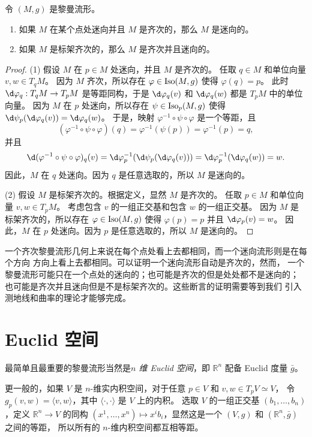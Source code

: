 \begin{proposition}
  令 $(M,g)$ 是黎曼流形。
  \begin{enumerate}
    \item 如果 $M$ 在某个点处迷向并且 $M$ 是齐次的，那么 $M$ 是迷向的。
    \item 如果 $M$ 是标架齐次的，那么 $M$ 是齐次并且迷向的。
  \end{enumerate}
\end{proposition}
\begin{proof}
  (1) 假设 $M$ 在 $p\in M$ 处迷向，并且 $M$ 是齐次的。
  任取 $q\in M$ 和单位向量 $v,w\in T_qM$。
  因为 $M$ 齐次，所以存在 $\varphi\in \operatorname{Iso}(M,g)$ 使得 $\varphi(q)=p$。
  此时 $\d\varphi_q:T_qM \to T_pM$ 是等距同构，于是 $\d\varphi_q(v)$
  和 $\d\varphi_q(w)$ 都是 $T_pM$ 中的单位向量。
  因为 $M$ 在 $p$ 处迷向，所以存在 $\psi\in \operatorname{Iso}_p(M,g)$ 使得
  $\d\psi_p(\d\varphi_q(v))=\d\varphi_q(w)$。
  于是，映射 $\varphi^{-1}\circ \psi\circ \varphi$ 是一个等距，且
  \[
    (\varphi^{-1}\circ \psi\circ \varphi)(q)=\varphi^{-1}(\psi(p))=\varphi^{-1}(p)=q,
  \]
  并且
  \[
    \d(\varphi^{-1}\circ \psi\circ \varphi)_q(v)
    =\d\varphi^{-1}_p(\d\psi_p(\d\varphi_q(v)))
    =\d\varphi^{-1}_p(\d\varphi_q(w))=w.
  \]
  因此，$M$ 在 $q$ 处迷向。因为 $q$ 是任意选取的，所以 $M$ 是迷向的。

  (2) 假设 $M$ 是标架齐次的。根据定义，显然 $M$ 是齐次的。
  任取 $p\in M$ 和单位向量 $v,w\in T_pM$。
  考虑包含 $v$ 的一组正交基和包含 $w$ 的一组正交基。 
  因为 $M$ 是标架齐次的，所以存在 $\varphi\in \operatorname{Iso}(M,g)$ 使得 $\varphi(p)=p$ 并且 $\d\varphi_p(v)=w$。
  因此，$M$ 在 $p$ 处迷向。因为 $p$ 是任意选取的，所以 $M$ 是迷向的。
\end{proof}

一个齐次黎曼流形几何上来说在每个点处看上去都相同，而一个迷向流形则是在每个方向
方向上看上去都相同。可以证明一个迷向流形自动是齐次的，然而，
一个黎曼流形可能只在一个点处的迷向的；也可能是齐次的但是处处都不是迷向的；
也可能是齐次并且迷向但是不是标架齐次的。这些断言的证明需要等到我们
引入测地线和曲率的理论才能够完成。

\section{Euclid 空间}

最简单且最重要的黎曼流形当然是\emph{$n$ 维 Euclid 空间}，即 $\mathbb{R}^n$
配备 Euclid 度量 $\bar g$。

更一般的，如果 $V$ 是 $n$-维实内积空间，对于任意 $p\in V$ 和 $v,w\in T_pV\simeq V$，
令 $g_p(v,w)=\langle v,w\rangle$，其中 $\langle\cdot,\cdot\rangle$ 是 $V$ 上的内积。
选取 $V$ 的一组正交基 $(b_1,\dots,b_n)$，定义 $\mathbb{R}^n\to V$ 的同构
$(x^1,\dots,x^n)\mapsto x^ib_i$，显然这是一个 $(V,g)$ 和 $(\mathbb{R}^n,\bar g)$ 之间的等距，
所以所有的 $n$-维内积空间都互相等距。

